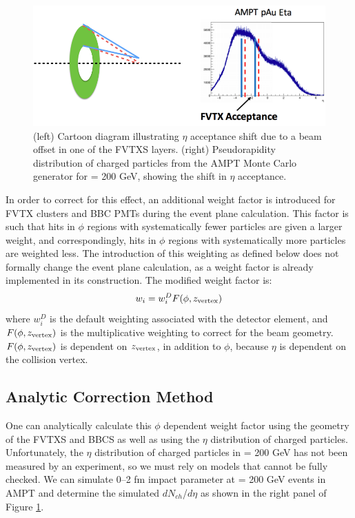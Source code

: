 \begin{figure}[!ht]
\centering
\includegraphics[width=0.95\linewidth]{figs/tilt_effect.png}
\caption{(left) Cartoon diagram illustrating $\eta$ acceptance shift due to a beam offset in one of the FVTXS layers. (right) Pseudorapidity distribution of charged particles from the AMPT Monte Carlo generator for \pau \sqsn = 200 GeV, showing the shift in $\eta$ acceptance.}
\label{fig:tilt_effect}
\end{figure}

In order to correct for this effect, an additional weight factor is introduced for FVTX clusters and BBC PMTs during the event plane calculation. This factor is such that hits in $\phi$ regions with systematically fewer particles are given a larger weight, and correspondingly, hits in $\phi$ regions with systematically more particles are weighted less. The introduction of this weighting as defined below does not formally change the event plane calculation, as a weight factor is already implemented in its construction. The modified weight factor is:
\begin{equation}
w_i = w^D_i F(\phi,z_{\rm vertex})
\label{eqn:modified_weight}
\end{equation}
where $w^D_i$ is the default weighting associated with the detector element, and $F(\phi,z_{\rm vertex})$ is the multiplicative weighting to correct for the beam geometry. $F(\phi,z_{\rm vertex})$ is dependent on $z_{\rm vertex}$, in addition to $\phi$, because $\eta$ is dependent on the collision vertex. 

\subsection{Analytic Correction Method}
One can analytically calculate this $\phi$ dependent weight factor using the geometry of the FVTXS and BBCS as well as using the $\eta$ distribution of charged particles. Unfortunately, the $\eta$ distribution of charged particles in \pau \sqsn = 200 GeV has not been measured by an experiment, so we must rely on models that cannot be fully checked. We can simulate 0--2 fm impact parameter \pau at \sqsn = 200 GeV events in AMPT and determine the simulated $dN_{ch}$/$d\eta$ as shown in the right panel of Figure \ref{fig:tilt_effect}. 

